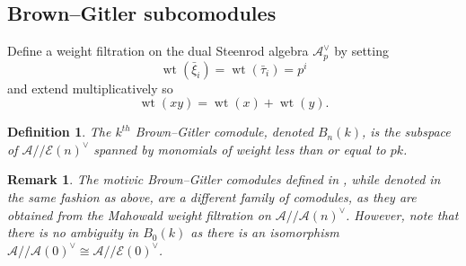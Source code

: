 \documentclass{amsart}
\newtheorem{remark}[theorem]{Remark}
\newtheorem{definition}[theorem]{Definition}
\theoremstyle{plain}
\numberwithin{theorem}{section}
\numberwithin{equation}{section}
\numberwithin{figure}{section}
\DeclareMathOperator{\wt}{wt}
\newcommand{\mM}{{\mathbb M}}
\newcommand{\cA}{{\mathcal A}}
\newcommand{\cE}{{\mathcal E}}
\newcommand{\0}{\langle 0 \rangle }
\begin{document}
\subsection{Brown--Gitler subcomodules}


Define a weight filtration on the dual Steenrod algebra $\cA_p^\vee$ by setting
\[
\wt(\bar{\xi}_i) = \wt(\bar{\tau}_i) = p^i
\]
and extend multiplicatively so
\[
\wt(xy) = \wt(x) + \wt(y).
\]
\begin{definition}
The $k^{th}$ Brown--Gitler comodule, denoted $B_n(k)$, is the subspace of $\cA // \cE (n)^\vee $ spanned by monomials of weight less than or equal to $pk$.
\end{definition}

\begin{remark}
    \rm The motivic Brown--Gitler comodules defined in \cite{CQ21,Realkqcoop}, while denoted in the same fashion as above, are a different family of comodules, as they are obtained from the Mahowald weight filtration on $\mathcal{A}//\mathcal{A}(n)^\vee$. However, note that there is no ambiguity in $B_0(k)$ as there is an isomorphism $\mathcal{A}//\mathcal{A}(0)^\vee \cong \mathcal{A}//\mathcal{E}(0)^\vee$.
\end{remark}

\end{document}

